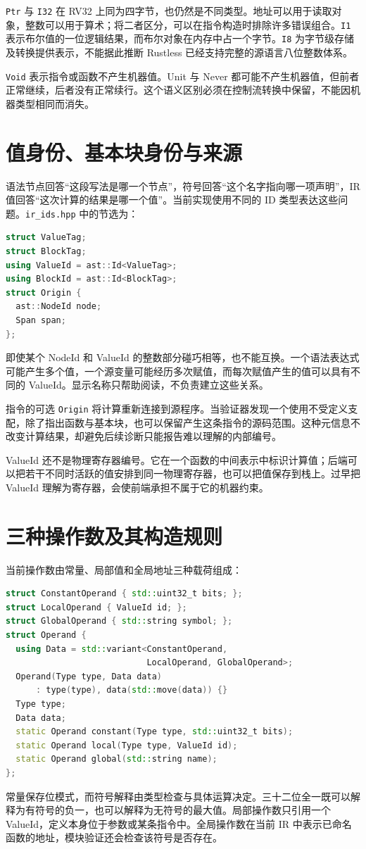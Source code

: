 \texttt{Ptr} 与 \texttt{I32} 在 RV32 上同为四字节，也仍然是不同类型。地址可以用于读取对象，整数可以用于算术；将二者区分，可以在指令构造时排除许多错误组合。\texttt{I1} 表示布尔值的一位逻辑结果，而布尔对象在内存中占一个字节。\texttt{I8} 为字节级存储及转换提供表示，不能据此推断 Rustless 已经支持完整的源语言八位整数体系。

\texttt{Void} 表示指令或函数不产生机器值。Unit 与 Never 都可能不产生机器值，但前者正常继续，后者没有正常续行。这个语义区别必须在控制流转换中保留，不能因机器类型相同而消失。

\section{值身份、基本块身份与来源}
语法节点回答“这段写法是哪一个节点”，符号回答“这个名字指向哪一项声明”，IR 值回答“这次计算的结果是哪一个值”。当前实现使用不同的 ID 类型表达这些问题。\texttt{ir\_ids.hpp} 中的节选为：
\begin{lstlisting}[language=C++,caption={计算身份与语法来源}]
struct ValueTag;
struct BlockTag;
using ValueId = ast::Id<ValueTag>;
using BlockId = ast::Id<BlockTag>;
struct Origin {
  ast::NodeId node;
  Span span;
};
\end{lstlisting}
即使某个 NodeId 和 ValueId 的整数部分碰巧相等，也不能互换。一个语法表达式可能产生多个值，一个源变量可能经历多次赋值，而每次赋值产生的值可以具有不同的 ValueId。显示名称只帮助阅读，不负责建立这些关系。

指令的可选 \texttt{Origin} 将计算重新连接到源程序。当验证器发现一个使用不受定义支配，除了指出函数与基本块，也可以保留产生这条指令的源码范围。这种元信息不改变计算结果，却避免后续诊断只能报告难以理解的内部编号。

ValueId 还不是物理寄存器编号。它在一个函数的中间表示中标识计算值；后端可以把若干不同时活跃的值安排到同一物理寄存器，也可以把值保存到栈上。过早把 ValueId 理解为寄存器，会使前端承担不属于它的机器约束。

\section{三种操作数及其构造规则}
当前操作数由常量、局部值和全局地址三种载荷组成：
\begin{lstlisting}[language=C++,caption={当前操作数的具体载荷}]
struct ConstantOperand { std::uint32_t bits; };
struct LocalOperand { ValueId id; };
struct GlobalOperand { std::string symbol; };
struct Operand {
  using Data = std::variant<ConstantOperand,
                            LocalOperand, GlobalOperand>;
  Operand(Type type, Data data)
      : type(type), data(std::move(data)) {}
  Type type;
  Data data;
  static Operand constant(Type type, std::uint32_t bits);
  static Operand local(Type type, ValueId id);
  static Operand global(std::string name);
};
\end{lstlisting}
常量保存位模式，而符号解释由类型检查与具体运算决定。三十二位全一既可以解释为有符号的负一，也可以解释为无符号的最大值。局部操作数只引用一个 ValueId，定义本身位于参数或某条指令中。全局操作数在当前 IR 中表示已命名函数的地址，模块验证还会检查该符号是否存在。

